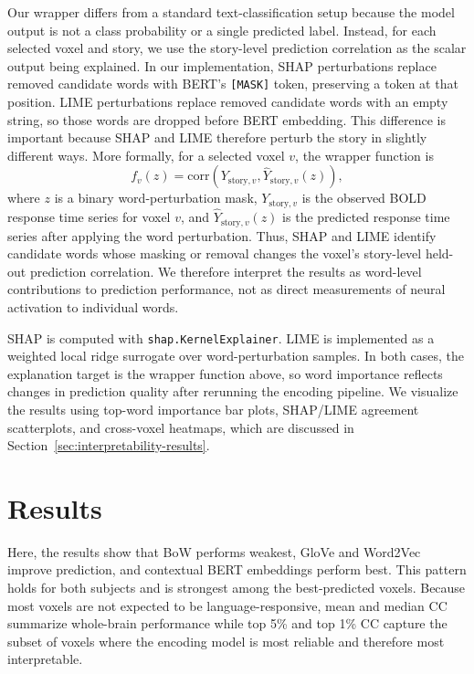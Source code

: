 \documentclass[11pt]{article}
\begin{document}
Our wrapper differs from a standard text-classification setup because the model output is not a class probability or a single predicted label. Instead, for each selected voxel and story, we use the story-level prediction correlation as the scalar output being explained. In our implementation, SHAP perturbations replace removed candidate words with BERT's \texttt{[MASK]} token, preserving a token at that position. LIME perturbations replace removed candidate words with an empty string, so those words are dropped before BERT embedding. This difference is important because SHAP and LIME therefore perturb the story in slightly different ways. More formally, for a selected voxel \(v\), the wrapper function is
\[
f_v(z) =
\mathrm{corr}\left(Y_{\mathrm{story},v},
\hat{Y}_{\mathrm{story},v}(z)\right),
\]
where \(z\) is a binary word-perturbation mask, \(Y_{\mathrm{story},v}\) is the observed BOLD response time series for voxel \(v\), and \(\hat{Y}_{\mathrm{story},v}(z)\) is the predicted response time series after applying the word perturbation. Thus, SHAP and LIME identify candidate words whose masking or removal changes the voxel's story-level held-out prediction correlation. We therefore interpret the results as word-level contributions to prediction performance, not as direct measurements of neural activation to individual words.

SHAP is computed with \texttt{shap.KernelExplainer}. LIME is implemented as a weighted local ridge surrogate over word-perturbation samples. In both cases, the explanation target is the wrapper function above, so word importance reflects changes in prediction quality after rerunning the encoding pipeline. We visualize the results using top-word importance bar plots, SHAP/LIME agreement scatterplots, and cross-voxel heatmaps, which are discussed in Section~\ref{sec:interpretability-results}.

\section{Results}
Here, the results show that BoW performs weakest, GloVe and Word2Vec improve prediction, and contextual BERT embeddings perform best. This pattern holds for both subjects and is strongest among the best-predicted voxels. Because most voxels are not expected to be language-responsive, mean and median CC summarize whole-brain performance while top 5\% and top 1\% CC capture the subset of voxels where the encoding model is most reliable and therefore most interpretable.
\end{document}
